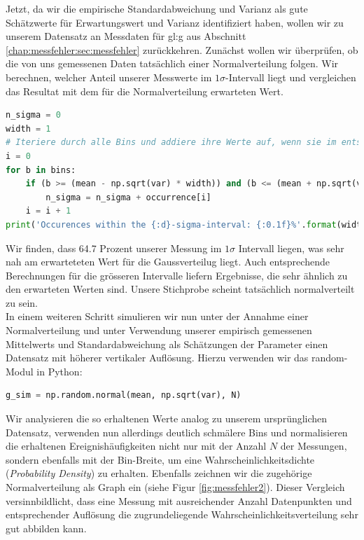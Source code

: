 Jetzt, da wir die empirische Standardabweichung und Varianz als gute Schätzwerte für Erwartungswert und Varianz identifiziert haben, wollen wir zu unserem Datensatz an Messdaten für \gls{gl:g} aus Abschnitt \ref{chap:messfehler:sec:messfehler} zurückkehren. Zunächst wollen wir überprüfen, ob die von uns gemessenen Daten  tatsächlich einer Normalverteilung folgen. Wir berechnen, welcher Anteil unserer Messwerte im $1\sigma$-Intervall liegt und vergleichen das Resultat mit dem für die Normalverteilung erwarteten Wert.
\begin{lstlisting}[language = Python]
n_sigma = 0
width = 1
# Iteriere durch alle Bins und addiere ihre Werte auf, wenn sie im entsprechenden Intervall liegen
i = 0
for b in bins:
    if (b >= (mean - np.sqrt(var) * width)) and (b <= (mean + np.sqrt(var) * width)):
        n_sigma = n_sigma + occurrence[i]
    i = i + 1
print('Occurences within the {:d}-sigma-interval: {:0.1f}%'.format(width,n_sigma/N*100))
\end{lstlisting}
Wir finden, dass 64.7 Prozent unserer Messung im $1\sigma $ Intervall liegen, was sehr nah am erwarteteten Wert für die Gaussverteilug liegt. Auch entsprechende Berechnungen für die grösseren Intervalle liefern Ergebnisse, die sehr ähnlich zu den erwarteten Werten sind. Unsere Stichprobe scheint tatsächlich normalverteilt zu sein. \\ 

In einem weiteren Schritt simulieren wir nun unter der Annahme einer Normalverteilung und unter Verwendung unserer empirisch gemessenen Mittelwerts und Standardabweichung als Schätzungen der Parameter einen Datensatz mit höherer vertikaler Auflösung. Hierzu verwenden wir das random-Modul in Python:
\begin{lstlisting}[language = Python]
g_sim = np.random.normal(mean, np.sqrt(var), N)
\end{lstlisting}
Wir analysieren die so erhaltenen Werte analog zu unserem ursprünglichen Datensatz, verwenden nun allerdings deutlich schmälere Bins und normalisieren die erhaltenen Ereignishäufigkeiten nicht nur mit der Anzahl $N$ der Messungen, sondern ebenfalls mit der Bin-Breite, um eine Wahrscheinlichkeitsdichte (\textit{Probability Density})  zu erhalten.  Ebenfalls zeichnen wir die zugehörige Normalverteilung als Graph ein (siehe Figur \ref{fig:messfehler2}). Dieser Vergleich versinnbildlicht, dass eine Messung mit ausreichender Anzahl Datenpunkten und entsprechender Auflösung die zugrundeliegende Wahrscheinlichkeitsverteilung sehr gut abbilden kann.

